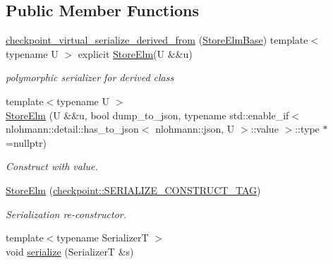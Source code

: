 \subsection*{Public Member Functions}
\begin{DoxyCompactItemize}
\item 
\hyperlink{structvt_1_1vrt_1_1collection_1_1storage_1_1_store_elm_3_01_t_00_01typename_01std_1_1enable__if_947e0655769addb625fb511f777768bd_a045703618378e71f8de2a9f00adbfc3b}{checkpoint\+\_\+virtual\+\_\+serialize\+\_\+derived\+\_\+from} (\hyperlink{structvt_1_1vrt_1_1collection_1_1storage_1_1_store_elm_base}{Store\+Elm\+Base}) template$<$ typename U $>$ explicit \hyperlink{structvt_1_1vrt_1_1collection_1_1storage_1_1_store_elm}{Store\+Elm}(U \&\&u)
\begin{DoxyCompactList}\small\item\em polymorphic serializer for derived class \end{DoxyCompactList}\item 
{\footnotesize template$<$typename U $>$ }\\\hyperlink{structvt_1_1vrt_1_1collection_1_1storage_1_1_store_elm_3_01_t_00_01typename_01std_1_1enable__if_947e0655769addb625fb511f777768bd_af0c14dee96665fe5fe7eb71172219d25}{Store\+Elm} (U \&\&u, bool dump\+\_\+to\+\_\+json, typename std\+::enable\+\_\+if$<$ nlohmann\+::detail\+::has\+\_\+to\+\_\+json$<$ nlohmann\+::json, U $>$\+::value $>$\+::type $\ast$=nullptr)
\begin{DoxyCompactList}\small\item\em Construct with value. \end{DoxyCompactList}\item 
\hyperlink{structvt_1_1vrt_1_1collection_1_1storage_1_1_store_elm_3_01_t_00_01typename_01std_1_1enable__if_947e0655769addb625fb511f777768bd_ad8dfd05ce5b4a6937906fce29733ac37}{Store\+Elm} (\hyperlink{namespacecheckpoint_a7ff642cff4d72d01a16ab10e9bc363ef}{checkpoint\+::\+S\+E\+R\+I\+A\+L\+I\+Z\+E\+\_\+\+C\+O\+N\+S\+T\+R\+U\+C\+T\+\_\+\+T\+AG})
\begin{DoxyCompactList}\small\item\em Serialization re-\/constructor. \end{DoxyCompactList}\item 
{\footnotesize template$<$typename SerializerT $>$ }\\void \hyperlink{structvt_1_1vrt_1_1collection_1_1storage_1_1_store_elm_3_01_t_00_01typename_01std_1_1enable__if_947e0655769addb625fb511f777768bd_ae4824f71a4909c65fab811ef7b97f9aa}{serialize} (SerializerT \&s)

\end{DoxyCompactItemize}
